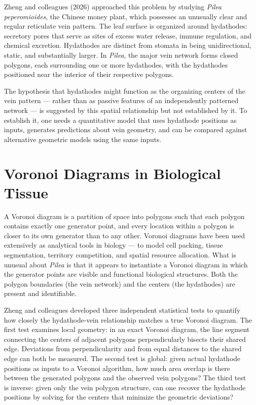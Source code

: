 \documentclass[12pt, a4paper, openany]{book}
\theoremstyle{definition}
\theoremstyle{remark}
\begin{document}
Zheng and colleagues (2026) approached this problem by studying \textit{Pilea peperomioides}, the Chinese money plant, which possesses an unusually clear and regular reticulate vein pattern. The leaf surface is organized around hydathodes: secretory pores that serve as sites of excess water release, immune regulation, and chemical excretion. Hydathodes are distinct from stomata in being unidirectional, static, and substantially larger. In \textit{Pilea}, the major vein network forms closed polygons, each surrounding one or more hydathodes, with the hydathodes positioned near the interior of their respective polygons.

The hypothesis that hydathodes might function as the organizing centers of the vein pattern — rather than as passive features of an independently patterned network — is suggested by this spatial relationship but not established by it. To establish it, one needs a quantitative model that uses hydathode positions as inputs, generates predictions about vein geometry, and can be compared against alternative geometric models using the same inputs.

\section{Voronoi Diagrams in Biological Tissue}

A Voronoi diagram is a partition of space into polygons such that each polygon contains exactly one generator point, and every location within a polygon is closer to its own generator than to any other. Voronoi diagrams have been used extensively as analytical tools in biology — to model cell packing, tissue segmentation, territory competition, and spatial resource allocation. What is unusual about \textit{Pilea} is that it appears to instantiate a Voronoi diagram in which the generator points are visible and functional biological structures. Both the polygon boundaries (the vein network) and the centers (the hydathodes) are present and identifiable.

Zheng and colleagues developed three independent statistical tests to quantify how closely the hydathode-vein relationship matches a true Voronoi diagram. The first test examines local geometry: in an exact Voronoi diagram, the line segment connecting the centers of adjacent polygons perpendicularly bisects their shared edge. Deviations from perpendicularity and from equal distances to the shared edge can both be measured. The second test is global: given actual hydathode positions as inputs to a Voronoi algorithm, how much area overlap is there between the generated polygons and the observed vein polygons? The third test is inverse: given only the vein polygon structure, can one recover the hydathode positions by solving for the centers that minimize the geometric deviations?
\end{document}
